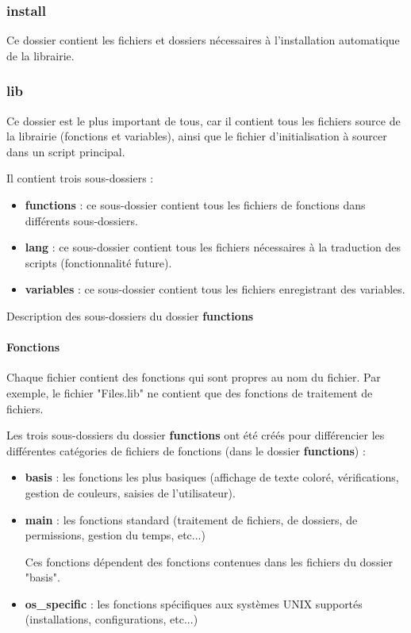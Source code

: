 \documentclass[a4paper,10pt]{article}
\begin{document}
\subsubsection{install}
Ce dossier contient les fichiers et dossiers nécessaires à l'installation automatique de la librairie.

\subsubsection{lib}
Ce dossier est le plus important de tous, car il contient tous les fichiers source de la librairie (fonctions et variables), ainsi que le fichier d'initialisation à sourcer dans un script principal.

Il contient trois sous-dossiers :
\begin{itemize}
    \item \textbf{functions} : ce sous-dossier contient tous les fichiers de fonctions dans différents sous-dossiers.
    \item \textbf{lang} : ce sous-dossier contient tous les fichiers nécessaires à la traduction des scripts (fonctionnalité future).
    \item \textbf{variables} : ce sous-dossier contient tous les fichiers enregistrant des variables.
\end{itemize}

Description des sous-dossiers du dossier \textbf{functions}
\setcounter{secnumdepth}{4}
\paragraph{Fonctions}
Chaque fichier contient des fonctions qui sont propres au nom du fichier. Par exemple, le fichier "Files.lib" ne contient que des fonctions de traitement de fichiers.

Les trois sous-dossiers du dossier \textbf{functions} ont été créés pour différencier les différentes catégories de fichiers de fonctions (dans le dossier \textbf{functions}) :
\begin{itemize}
    \item \textbf{basis} : les fonctions les plus basiques (affichage de texte coloré, vérifications, gestion de couleurs, saisies de l'utilisateur).
    
    \item \textbf{main} : les fonctions standard (traitement de fichiers, de dossiers, de permissions, gestion du temps, etc...)

    Ces fonctions dépendent des fonctions contenues dans les fichiers du dossier "basis".

    \item \textbf{os\_specific} : les fonctions spécifiques aux systèmes UNIX supportés (installations, configurations, etc...)
\end{itemize}
\end{document}
